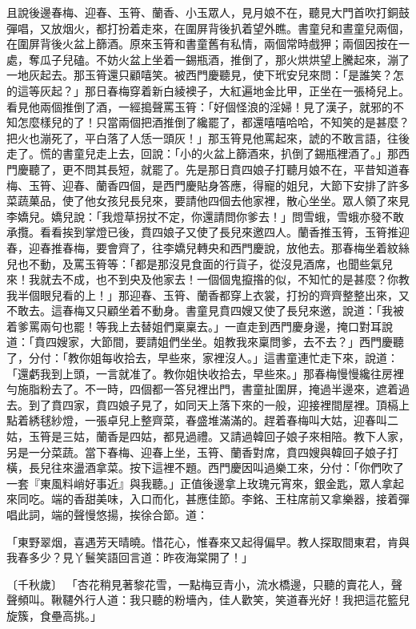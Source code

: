 \begin{showcontents}{}
且說後邊春梅、迎春、玉筲、蘭香、小玉眾人，見月娘不在，聽見大門首吹打銅鼓彈唱，又放烟火，都打扮着走來，在圍屏背後扒着望外瞧。書童兒和晝童兒兩個，在圍屏背後火盆上篩酒。原來玉筲和書童舊有私情，兩個常時戲狎；兩個因按在一處，奪瓜子兒磕。不妨火盆上坐着一錫瓶酒，推倒了，那火烘烘望上騰起來，漰了一地灰起去。那玉筲還只顧嘻笑。被西門慶聽見，使下玳安兒來問：「是誰笑？怎的這等灰起？」那日春梅穿着新白綾襖子，大紅遍地金比甲，正坐在一張椅兒上。看見他兩個推倒了酒，一經搗聲罵玉筲：「好個怪浪的淫婦！見了漢子，就邪的不知怎麼樣兒的了！只當兩個把酒推倒了纔罷了，都還嘻嘻哈哈，不知笑的是甚麼？把火也漰死了，平白落了人恁一頭灰！」那玉筲見他罵起來，諕的不敢言語，往後走了。慌的書童兒走上去，回說：「小的火盆上篩酒來，扒倒了錫瓶裡酒了。」那西門慶聽了，更不問其長短，就罷了。先是那日賁四娘子打聽月娘不在，平昔知道春梅、玉筲、迎春、蘭香四個，是西門慶貼身答應，得寵的姐兒，大節下安排了許多菜蔬菓品，使了他女孩兒長兒來，要請他四個去他家裡，散心坐坐。眾人領了來見李嬌兒。嬌兒說：「我燈草拐扙不定，你還請問你爹去！」問雪蛾，雪蛾亦發不敢承攬。看看挨到掌燈已後，賁四娘子又使了長兒來邀四人。蘭香推玉筲，玉筲推迎春，迎春推春梅，要會齊了，往李嬌兒轉央和西門慶說，放他去。那春梅坐着紋絲兒也不動，及罵玉筲等：「都是那沒見食面的行貨子，從沒見酒席，也聞些氣兒來！我就去不成，也不到央及他家去！一個個鬼攛揝的似，不知忙的是甚麼？你教我半個眼兒看的上！」那迎春、玉筲、蘭香都穿上衣裳，打扮的齊齊整整出來，又不敢去。這春梅又只顧坐着不動身。書童見賁四嫂又使了長兒來邀，說道：「我被着爹罵兩句也罷！等我上去替姐們稟稟去。」一直走到西門慶身邊，掩口對耳說道：「賁四嫂家，大節間，要請姐們坐坐。姐教我來稟問爹，去不去？」西門慶聽了，分付：「教你姐每收拾去，早些來，家裡沒人。」這書童連忙走下來，說道：「還虧我到上頭，一言就准了。教你姐快收拾去，早些來。」那春梅慢慢纔往房裡勻施脂粉去了。不一時，四個都一答兒裡出門，書童扯圍屏，掩過半邊來，遮着過去。到了賁四家，賁四娘子見了，如同天上落下來的一般，迎接裡間屋裡。頂槅上點着綉毬紗燈，一張卓兒上整齊菜，春盛堆滿滿的。趕着春梅叫大姑，迎春叫二姑，玉筲是三姑，蘭香是四姑，都見過禮。又請過韓回子娘子來相陪。教下人家，另是一分菜蔬。當下春梅、迎春上坐，玉筲、蘭香對席，賁四嫂與韓回子娘子打橫，長兒往來盪酒拿菜。按下這裡不題。西門慶因叫過樂工來，分付：「你們吹了一套『東風料峭好事近』與我聽。」正值後邊拿上玫瑰元宵來，銀金匙，眾人拿起來同吃。端的香甜美味，入口而化，甚應佳節。李銘、王柱席前又拿樂器，接着彈唱此詞，端的聲慢悠揚，挨徐合節。道：

「東野翠烟，喜遇芳天晴曉。惜花心，惟春來又起得偏早。教人探取間東君，肯與我春多少？見丫鬟笑語回言道：昨夜海棠開了！」

〔千秋歲〕  「杏花稍見著黎花雪，一點梅豆青小，流水橋邊，只聽的賣花人，聲聲頻叫。鞦韆外行人道：我只聽的粉墻內，佳人歡笑，笑道春光好！我把這花籃兒旋簇，食壘高挑。」


\end{showcontents}
